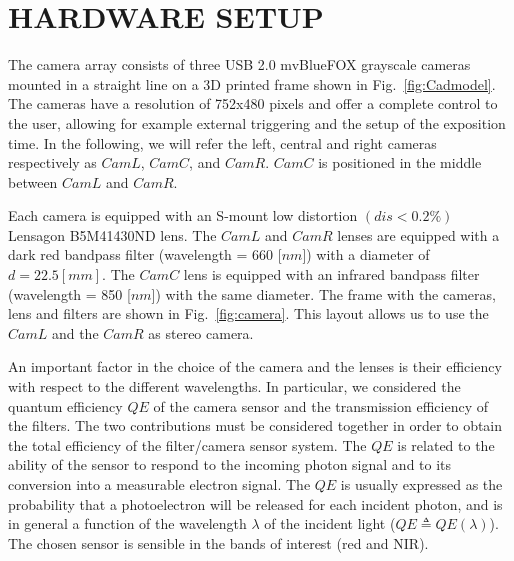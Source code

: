 \documentclass[a4paper, 10pt, conference]{ieeeconf}      %
\begin{document}


\section{HARDWARE SETUP}\label{sec:hardware}

The camera array consists of three USB 2.0 mvBlueFOX grayscale cameras mounted in a straight line on a 3D printed frame shown in  Fig.~\ref{fig:Cadmodel}.
The cameras have a resolution of 752x480 pixels and offer a complete control to the user, allowing for example external triggering and the setup of the exposition time.
In the following, we will refer the left, central and right cameras respectively as $CamL$, $CamC$, and $CamR$. 
$CamC$ is positioned in the middle between $CamL$ and $CamR$.

Each camera is equipped with an S-mount low distortion $(dis< 0.2 \% )$ Lensagon B5M41430ND lens.
The $CamL$ and $CamR$ lenses are equipped with a dark red bandpass filter (wavelength = 660 [$ nm $]) with a diameter of $ d=22.5 [mm]$.
The $CamC$ lens is equipped with an infrared bandpass filter (wavelength = 850 [$ nm $]) with the same diameter.
The frame with the cameras, lens and filters  are shown in Fig.~\ref{fig:camera}.
This layout allows us to use the $CamL$ and the $CamR$ as stereo camera.

An important factor in the choice of the camera and the lenses is their efficiency with respect to the different wavelengths.
In particular, we considered the quantum efficiency $QE$ of the camera sensor and the transmission efficiency of the filters.
The two contributions must be considered together in order to obtain the  total efficiency of the filter/camera sensor system.
%
The $QE$ is related to the ability of the sensor to respond to the incoming photon signal and to its conversion into a measurable electron signal.
The $QE$ is usually expressed as the probability that a photoelectron will be released for each incident photon, and is in general a function of the wavelength $\lambda$ of the incident light ($QE\triangleq QE(\lambda)$).
The chosen sensor is sensible in the bands of interest (red and NIR).
\end{document}
